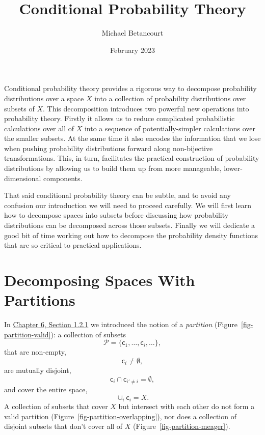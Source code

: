 \documentclass[
  letterpaper,
  DIV=11,
  numbers=noendperiod]{scrartcl}
\title{Conditional Probability Theory}
\author{Michael Betancourt}
\date{February 2023}
\renewcommand*\contentsname{Table of contents}
\newcommand\contentsname{Table of contents}
\begin{document}
\maketitle

\renewcommand*\contentsname{Table of contents}
{
\hypersetup{linkcolor=}
\setcounter{tocdepth}{3}
\tableofcontents
}
\newcommand{\I}[2]{\mathbb{I}_{#1} \! \left[ #2 \right]}

\newcommand{\E}[2]{\mathbb{E}_{#1} \! \left[ #2 \right]}

\newcommand{\rnd}[2]{\frac{ \mathrm{d} #1}{ \mathrm{d} #2 }}

Conditional probability theory provides a rigorous way to decompose
probability distributions over a space \(X\) into a collection of
probability distributions over subsets of \(X\). This decomposition
introduces two powerful new operations into probability theory. Firstly
it allows us to reduce complicated probabilistic calculations over all
of \(X\) into a sequence of potentially-simpler calculations over the
smaller subsets. At the same time it also encodes the information that
we lose when pushing probability distributions forward along
non-bijective transformations. This, in turn, facilitates the practical
construction of probability distributions by allowing us to build them
up from more manageable, lower-dimensional components.

That said conditional probability theory can be subtle, and to avoid any
confusion our introduction we will need to proceed carefully. We will
first learn how to decompose spaces into subsets before discussing how
probability distributions can be decomposed across those subsets.
Finally we will dedicate a good bit of time working out how to decompose
the probability density functions that are so critical to practical
applications.

\section{Decomposing Spaces With Partitions}\label{sec:partitions}

In
\href{https://betanalpha.github.io/assets/chapters_html/density_functions.html\#sigma-finite-measures}{Chapter
6, Section 1.2.1} we introduced the notion of a \emph{partition}
(Figure~\ref{fig-partition-valid}): a collection of subsets \[
\mathcal{P}
= \{ \mathsf{c}_{1}, \ldots, \mathsf{c}_{i}, \ldots \},
\] that are non-empty, \[
\mathsf{c}_{i} \ne \emptyset,
\] are mutually disjoint, \[
\mathsf{c}_{i} \cap \mathsf{c}_{i' \ne i} = \emptyset,
\] and cover the entire space, \[
\cup_{i} \mathsf{c}_{i} = X.
\] A collection of subsets that cover \(X\) but intersect with each
other do not form a valid partition
(Figure~\ref{fig-partition-overlapping}), nor does a collection of
disjoint subsets that don't cover all of \(X\)
(Figure~\ref{fig-partition-meager}).
\end{document}
